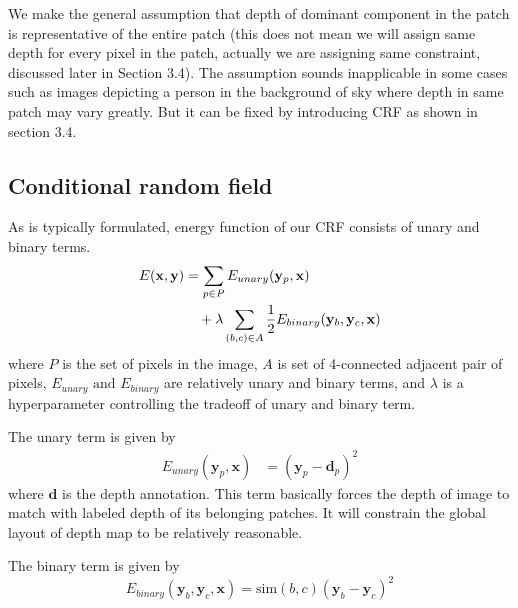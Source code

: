 \documentclass[10pt,twocolumn,letterpaper]{article}
\begin{document}
We make the general assumption that depth of dominant component in the patch is representative of the entire patch (this does not mean we will assign same depth for every pixel in the patch, actually we are assigning same constraint, discussed later in Section 3.4). The assumption sounds inapplicable in some cases such as images depicting a person in the background of sky where depth in same patch may vary greatly. But it can be fixed by introducing CRF as shown in section 3.4.

\subsection{Conditional random field}
As is typically formulated, energy function of our CRF consists of unary and binary terms.
\begin{align}
E(\mathbf{x}, \mathbf{y}) &= \sum_{p \in P}E_{unary}(\mathbf{y}_{p}, \mathbf{x}) \notag \\ &\quad + \lambda \sum_{(b, c) \in A} \frac{1}{2} E_{binary}(\mathbf{y}_b, \mathbf{y}_c, \mathbf{x})
\end{align}
where $P$ is the set of pixels in the image, $A$ is set of 4-connected adjacent pair of pixels, $E_{unary}\text{ and }E_{binary}$ are relatively unary and binary terms, and $\lambda$ is a hyperparameter controlling the tradeoff of unary and binary term.

The unary term is given by
\begin{align}
E_{unary}(\mathbf{y}_{p}, \mathbf{x}) &= (\mathbf{y}_p - \mathbf{d}_p)^2
\end{align}
where $\mathbf{d}$ is the depth annotation. This term basically forces the depth of image to match with labeled depth of its belonging patches. It will constrain the global layout of depth map to be relatively reasonable. 


\par
The binary term is given by
\begin{equation}
E_{binary}(\mathbf{y}_b, \mathbf{y}_c, \mathbf{x}) = \text{sim}(b, c) (\mathbf{y}_b-\mathbf{y}_c)^2
\end{equation}
\end{document}
